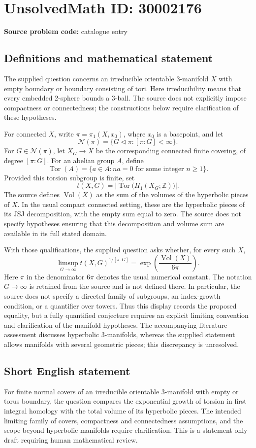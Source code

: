 \documentclass[11pt]{article}
\newcommand{\Z}{\mathbb{Z}}
\begin{document}
\section*{UnsolvedMath ID: 30002176}
\textbf{Source problem code:} catalogue entry
\subsection{Definitions and mathematical statement}
The supplied question concerns an irreducible orientable \(3\)-manifold \(X\) with empty boundary or boundary consisting of tori. Here irreducibility means that every embedded \(2\)-sphere bounds a \(3\)-ball. The source does not explicitly impose compactness or connectedness; the constructions below require clarification of these hypotheses.

For connected \(X\), write \(\pi=\pi_1(X,x_0)\), where \(x_0\) is a basepoint, and let
\[
\mathcal{N}(\pi)=\{G\triangleleft\pi:[\pi:G]<\infty\}.
\]
For \(G\in\mathcal{N}(\pi)\), let \(X_G\to X\) be the corresponding connected finite covering, of degree \([\pi:G]\). For an abelian group \(A\), define
\[
\operatorname{Tor}(A)=\{a\in A:na=0\text{ for some integer }n\geq1\}.
\]
Provided this torsion subgroup is finite, set
\[
t(X,G)=\left|\operatorname{Tor}\bigl(H_1(X_G;\Z)\bigr)\right|.
\]
The source defines \(\operatorname{Vol}(X)\) as the sum of the volumes of the hyperbolic pieces of \(X\). In the usual compact connected setting, these are the hyperbolic pieces of its JSJ decomposition, with the empty sum equal to zero. The source does not specify hypotheses ensuring that this decomposition and volume sum are available in its full stated domain.

With those qualifications, the supplied question asks whether, for every such \(X\),
\[
\limsup_{G\to\infty}
 t(X,G)^{1/[\pi:G]}
 =\exp\!\left(\frac{\operatorname{Vol}(X)}{6\pi}\right).
\]
Here \(\pi\) in the denominator \(6\pi\) denotes the usual numerical constant. The notation \(G\to\infty\) is retained from the source and is not defined there. In particular, the source does not specify a directed family of subgroups, an index-growth condition, or a quantifier over towers. Thus this display records the proposed equality, but a fully quantified conjecture requires an explicit limiting convention and clarification of the manifold hypotheses. The accompanying literature assessment discusses hyperbolic \(3\)-manifolds, whereas the supplied statement allows manifolds with several geometric pieces; this discrepancy is unresolved.
\subsection{Short English statement}
For finite normal covers of an irreducible orientable \(3\)-manifold with empty or torus boundary, the question compares the exponential growth of torsion in first integral homology with the total volume of its hyperbolic pieces. The intended limiting family of covers, compactness and connectedness assumptions, and the scope beyond hyperbolic manifolds require clarification. This is a statement-only draft requiring human mathematical review.
\end{document}
